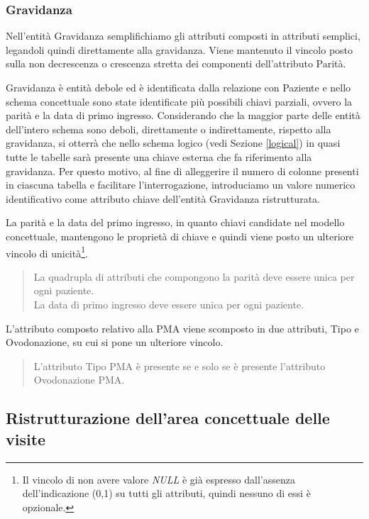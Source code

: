 \subsubsection{Gravidanza}

Nell'entità Gravidanza semplifichiamo gli attributi composti in attributi semplici, legandoli quindi direttamente alla gravidanza.
Viene mantenuto il vincolo posto sulla non decrescenza o crescenza stretta dei componenti dell'attributo Parità.

Gravidanza è entità debole ed è identificata dalla relazione con Paziente e nello schema concettuale sono state identificate più possibili chiavi parziali, ovvero la parità e la data di primo ingresso.
Considerando che la maggior parte delle entità dell'intero schema sono deboli, direttamente o indirettamente, rispetto alla gravidanza, si otterrà che nello schema logico (vedi Sezione \ref{logical}) in quasi tutte le tabelle sarà presente una chiave esterna che fa riferimento alla gravidanza.
Per questo motivo, al fine di alleggerire il numero di colonne presenti in ciascuna tabella e facilitare l'interrogazione, introduciamo un valore numerico identificativo come attributo chiave dell'entità Gravidanza ristrutturata.

La parità e la data del primo ingresso, in quanto chiavi candidate nel modello concettuale, mantengono le proprietà di chiave e quindi viene posto un ulteriore vincolo di unicità\footnote{
    Il vincolo di non avere valore \emph{NULL} è già espresso dall'assenza dell'indicazione (0,1) su tutti gli attributi, quindi nessuno di essi è opzionale.
}.
\begin{quote}
La quadrupla di attributi che compongono la parità deve essere unica per ogni paziente. \\
La data di primo ingresso deve essere unica per ogni paziente.
\end{quote}

L'attributo composto relativo alla PMA viene scomposto in due attributi, Tipo e Ovodonazione, su cui si pone un ulteriore vincolo.
\begin{quote}
L'attributo Tipo PMA è presente se e solo se è presente l'attributo Ovodonazione PMA.
\end{quote}

\subsection{Ristrutturazione dell'area concettuale delle visite}

